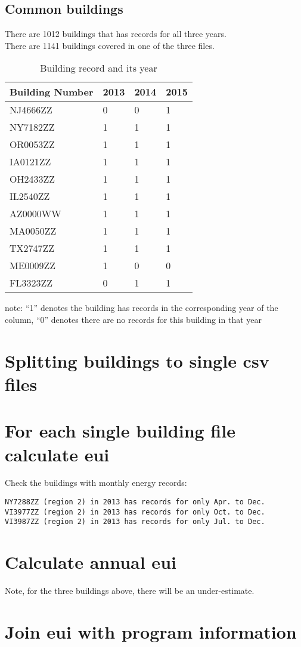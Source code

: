 \documentclass[12pt]{article}
\begin{document}
\subsection{Common buildings}
There are 1012 buildings that has records for all three years.\\
There are 1141 buildings covered in one of the three files.
\begin{table}[h!]
\centering
\caption{Building record and its year}
\label{my-label}
\begin{tabular}{llll}
  \hline
Building Number & 2013 & 2014 & 2015 \\
  \hline
NJ4666ZZ        & 0    & 0    & 1    \\
NY7182ZZ        & 1    & 1    & 1    \\
OR0053ZZ        & 1    & 1    & 1    \\
IA0121ZZ        & 1    & 1    & 1    \\
OH2433ZZ        & 1    & 1    & 1    \\
IL2540ZZ        & 1    & 1    & 1    \\
AZ0000WW        & 1    & 1    & 1    \\
MA0050ZZ        & 1    & 1    & 1    \\
TX2747ZZ        & 1    & 1    & 1    \\
ME0009ZZ        & 1    & 0    & 0    \\
FL3323ZZ        & 0    & 1    & 1    \\
  \hline
\end{tabular}
\end{table}

note: ``1'' denotes the building has records in the corresponding
year of the column, ``0'' denotes there are no records for this
building in that year

\section{Splitting buildings to single csv files}
\section{For each single building file calculate eui}
Check the buildings with monthly energy records:
\begin{verbatim}
NY7288ZZ (region 2) in 2013 has records for only Apr. to Dec.
VI3977ZZ (region 2) in 2013 has records for only Oct. to Dec.
VI3987ZZ (region 2) in 2013 has records for only Jul. to Dec.
\end{verbatim}

\section{Calculate annual eui}
Note, for the three buildings above, there will be an under-estimate.
\section{Join eui with program information}

\newpage
 
\end{document}
